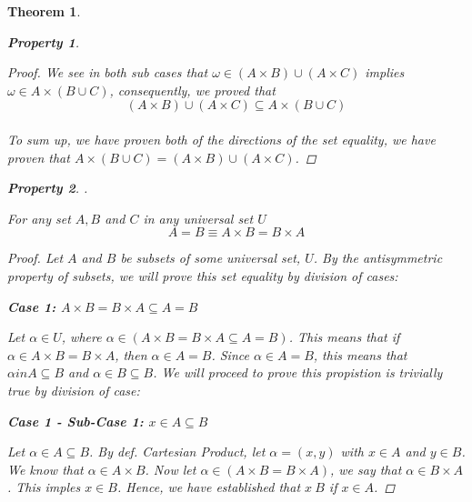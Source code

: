 \documentclass{book}
\newtheorem{theorem}{Theorem}[section]
\newtheorem{property}{Property}[theorem]
\theoremstyle{definition}
\theoremstyle{remark}
\begin{document}
\begin{theorem}
\begin{property}
\begin{proof}
                We see in both sub cases that $\omega \in (A \times B) \cup (A \times C)$ implies $\omega \in A \times (B \cup C)$, consequently, we proved that $$(A \times B) \cup (A \times C) \subseteq A \times (B \cup C)$$ \\ 
            To sum up, we have proven both of the directions of the set equality, we have proven that $A \times (B \cup C) = (A \times B) \cup (A \times C)$. 
        \end{proof}
    \end{property}
    
    
    
    
    \newpage
    \begin{property}
    . \\
        \begin{tcolorbox}
            For any set $A, B$ and $C$ in any universal set $U$
                \begin{equation*}
                    A = B \equiv A \times B = B \times A
                \end{equation*}
        \end{tcolorbox}
    
        \begin{proof}
            Let $A$ and $B$ be subsets of some universal set, $U$. By the antisymmetric property of subsets, we will prove this set equality by division of cases:
            
            \begin{flushleft} \textbf{Case 1: $A \times B = B \times A \subseteq A = B$} \end{flushleft}
                Let $\alpha \in U$, where $\alpha \in (A \times B = B \times A \subseteq A = B)$. This means that if $\alpha \in A \times B = B \times A$, then $\alpha \in A = B$. Since $\alpha \in A = B$, this means that $\alpha in A \subseteq B$ and $\alpha \in B \subseteq B$. We will proceed to prove this propistion is trivially true by division of case:
    
                
                    \begin{flushleft} \textbf{Case 1 - Sub-Case 1: $x \in A \subseteq B$} \end{flushleft}
                        Let $\alpha \in A \subseteq B$. By def. Cartesian Product, let $\alpha = (x,y)$ with $x \in A$ and $y \in B$. We know that $\alpha \in A \times B$. Now let $\alpha \in (A \times B = B \times A)$, we say that $\alpha \in B \times A$. This imples $x \in B$. Hence, we have established that $x \ B$ if $x \in A$.
                    

\end{proof}
\end{property}
\end{theorem}
\end{document}
